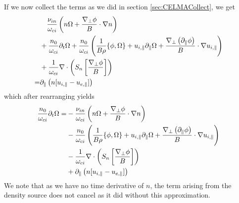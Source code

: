 %
If we now collect the terms as we did in section
\ref{sec:CELMACollect}, we get
%
\begin{align*}
  &
  \quad
 \frac{\nu_{in}}{\omega_{ci}} \left(n\Omega + \frac{\nabla_\perp \phi}{B} \cdot \nabla n\right)
  \\
 &
 + \frac{n_0}{\omega_{ci}}\partial_t\Omega
 + \frac{n_0}{\omega_{ci}}
 \left(
 \frac{1}{B\rho}\{\phi, \Omega\}
 + u_{i,\|}\partial_\|\Omega
 + \frac{\nabla_\perp\left( \partial_\|\phi\right)}{B}\cdot\nabla u_{i,\|}
 \right)
 \\
 &
 + \frac{1}{\omega_{ci}}
    \nabla\cdot \left( S_n \left[ \frac{ \nabla_\perp \phi }{ B } \right] \right)
 \\
 =&
 \partial_\| \left(n [u_{i,\|} - u_{e,\|}]\right)
\end{align*}
%
which after rearranging yields
%
\begin{align*}
 \frac{n_0}{\omega_{ci}}\partial_t\Omega
 =&
 - \frac{\nu_{in}}{\omega_{ci}} \left(n\Omega + \frac{\nabla_\perp \phi}{B} \cdot \nabla n\right)
  \\
 &- \frac{n_0}{\omega_{ci}}
 \left( \frac{1}{B\rho}\{\phi, \Omega\}
    + u_{i,\|}\partial_\|\Omega
    + \frac{\nabla_\perp\left( \partial_\|\phi\right)}{B}\cdot\nabla u_{i,\|}
 \right)
 \\
 &
 - \frac{1}{\omega_{ci}}
    \nabla\cdot \left( S_n \left[ \frac{ \nabla_\perp \phi }{ B } \right] \right)
 \\
 &
 + \partial_\| \left(n [u_{i,\|} - u_{e,\|}]\right)
\end{align*}
%
We note that as we have no time derivative of $n$, the term arising from the
density source does not cancel as it did without this approximation.
%

